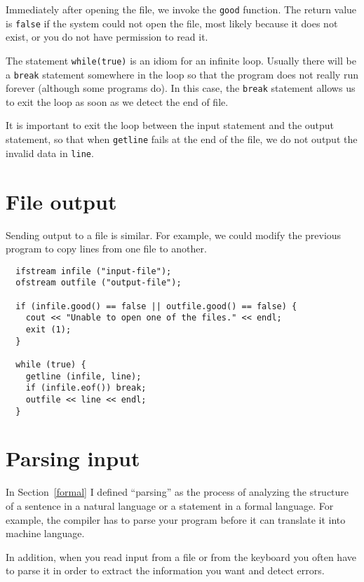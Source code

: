 Immediately after opening the file, we invoke the {\tt good} function.
The return value is {\tt false} if the system could not open the file,
most likely because it does not exist, or you do not have permission
to read it.


The statement {\tt while(true)} is an idiom for an infinite
loop.  Usually there will be a {\tt break} statement somewhere in
the loop so that the program does not really run forever (although
some programs do).  In this case, the {\tt break} statement allows
us to exit the loop as soon as we detect the end of file.


It is important to exit the loop between the input statement and
the output statement, so that when {\tt getline} fails at the
end of the file, we do not output the invalid data in {\tt line}.

\section{File output}

Sending output to a file is similar.  For example, we could
modify the previous program to copy lines from one file to
another.

\begin{lstlisting}
  ifstream infile ("input-file");
  ofstream outfile ("output-file");

  if (infile.good() == false || outfile.good() == false) {
    cout << "Unable to open one of the files." << endl;
    exit (1);
  }

  while (true) {
    getline (infile, line);
    if (infile.eof()) break;
    outfile << line << endl;
  }
\end{lstlisting}

\section{Parsing input}
\label{parsing}

In Section~\ref{formal} I defined ``parsing'' as the process of
analyzing the structure of a sentence in a natural language or a
statement in a formal language.  For example, the compiler has to
parse your program before it can translate it into machine language.

In addition, when you read input from a file or from the keyboard
you often have to parse it in order to extract the information
you want and detect errors.

